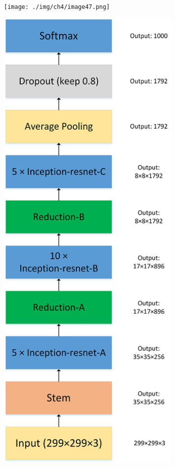 \begin{figure}
\centering
\texttt{[image: ./img/ch4/image47.png]}
\caption{}
\end{figure}

\begin{figure}
\centering
\includegraphics[width=0.8\textwidth]{./img/ch4/image63.png}
\caption{}
\end{figure}

